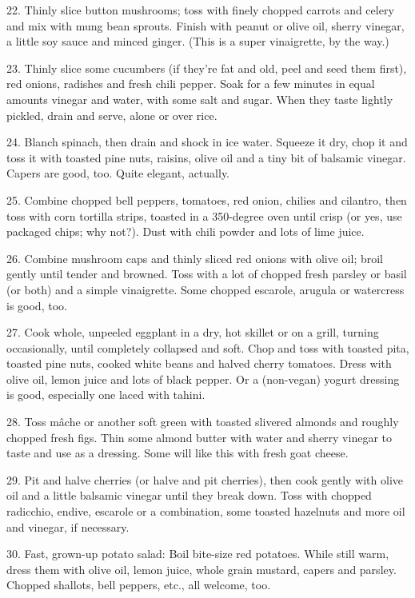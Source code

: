\begin{recipe}
22. Thinly slice button mushrooms; toss with finely chopped carrots
and celery and mix with mung bean sprouts. Finish with peanut or olive
oil, sherry vinegar, a little soy sauce and minced ginger. (This is a
super vinaigrette, by the way.)

23. Thinly slice some cucumbers (if they're fat and old, peel and seed
them first), red onions, radishes and fresh chili pepper. Soak for a
few minutes in equal amounts vinegar and water, with some salt and
sugar. When they taste lightly pickled, drain and serve, alone or over
rice.

24. Blanch spinach, then drain and shock in ice water. Squeeze it dry,
chop it and toss it with toasted pine nuts, raisins, olive oil and a
tiny bit of balsamic vinegar. Capers are good, too. Quite elegant,
actually.

25. Combine chopped bell peppers, tomatoes, red onion, chilies and
cilantro, then toss with corn tortilla strips, toasted in a 350-degree
oven until crisp (or yes, use packaged chips; why not?). Dust with
chili powder and lots of lime juice.

26. Combine mushroom caps and thinly sliced red onions with olive oil;
broil gently until tender and browned. Toss with a lot of chopped
fresh parsley or basil (or both) and a simple vinaigrette. Some
chopped escarole, arugula or watercress is good, too.

27. Cook whole, unpeeled eggplant in a dry, hot skillet or on a grill,
turning occasionally, until completely collapsed and soft. Chop and
toss with toasted pita, toasted pine nuts, cooked white beans and
halved cherry tomatoes. Dress with olive oil, lemon juice and lots of
black pepper. Or a (non-vegan) yogurt dressing is good, especially one
laced with tahini.

28. Toss m\^ache or another soft green with toasted slivered almonds and
roughly chopped fresh figs. Thin some almond butter with water and
sherry vinegar to taste and use as a dressing. Some will like this
with fresh goat cheese.

29. Pit and halve cherries (or halve and pit cherries), then cook
gently with olive oil and a little balsamic vinegar until they break
down. Toss with chopped radicchio, endive, escarole or a combination,
some toasted hazelnuts and more oil and vinegar, if necessary.

30. Fast, grown-up potato salad: Boil bite-size red potatoes. While
still warm, dress them with olive oil, lemon juice, whole grain
mustard, capers and parsley. Chopped shallots, bell peppers, etc., all
welcome, too.


\end{recipe}
